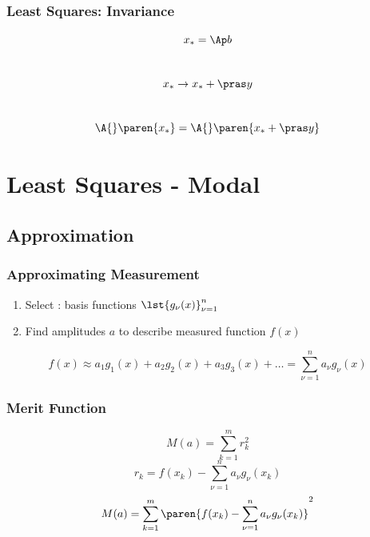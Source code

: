 \documentclass[]{beamer}
\begin{document}
\begin{frame}      %
\frametitle{Least Squares: Invariance}
  $$x_{*} = \Ap b$$ \\[10pt]
  $$x_{*} \rightarrow x_{*} + \pras y$$ \\[10pt]
  $$\A{}\paren{x_{*}} = \A{}\paren{x_{*} + \pras y}$$
  \twodots
\end{frame}

\section{Least Squares - Modal}

\subsection{Approximation}

\begin{frame}      %
\frametitle{Approximating Measurement}
  \begin{enumerate}
    \item Select : basis functions $\lst{g_{\nu}(x)}_{\nu=1}^{n}$ \\[15pt]
    \item Find amplitudes $a$ to describe measured function $f(x)$ \\[15pt]
  \end{enumerate}
  $$f ( x ) \approx a_{1} g_{1}(x) + a_{2} g_{2}(x) + a_{3} g_{3}(x) + \dots = \sum\limits_{\nu=1}^{n} a_{\nu} g_{\nu}(x)$$ 
\end{frame}

\begin{frame}      %
\frametitle{Merit Function}
  $$M(a) = \sum_{k = 1}^{m} r_{k}^{2}$$
  \pause
  $$r_{k} = f(x_{k}) - \sum_{\nu = 1}^{n} a_{\nu} g_{\nu}(x_{k})$$
  \pause
  $$M(a) = \sum_{k = 1}^{m} \paren{f(x_{k}) - \sum_{\nu = 1}^{n} a_{\nu} g_{\nu}(x_{k})}^{2}$$
\end{frame}
\end{document}
